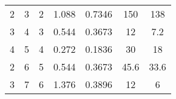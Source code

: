 \begin{table}[b]
\begin{tabular}{@{}ccccccc@{}}
2                                                            & 3                                                              & 2                                                    & 1.088                                                                            & 0.7346                                                                         & 150                                                                             & 138                                                                                 \\
3                                                            & 4                                                              & 3                                                    & 0.544                                                                            & 0.3673                                                                         & 12                                                                              & 7.2                                                                                 \\
4                                                            & 5                                                              & 4                                                    & 0.272                                                                            & 0.1836                                                                         & 30                                                                              & 18                                                                                  \\
2                                                            & 6                                                              & 5                                                    & 0.544                                                                            & 0.3673                                                                         & 45.6                                                                            & 33.6                                                                                \\
3                                                            & 7                                                              & 6                                                    & 1.376                                                                            & 0.3896                                                                         & 12                                                                              & 6                                                                                   \\

\end{tabular}
\end{table}

